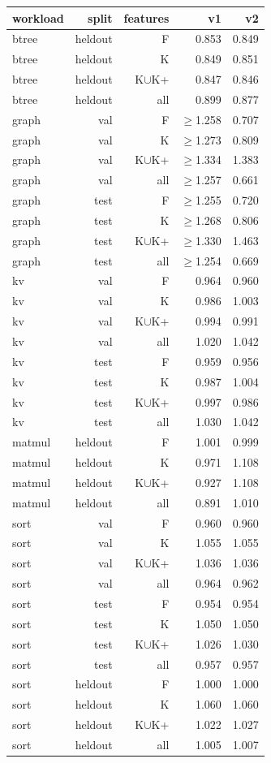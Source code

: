 \begin{tabular}{lrrrr}
\toprule
workload & split & features & v1 & v2 \\
\midrule
btree & heldout & F & 0.853 & 0.849 \\
btree & heldout & K & 0.849 & 0.851 \\
btree & heldout & K$\cup$K{+} & 0.847 & 0.846 \\
btree & heldout & all & 0.899 & 0.877 \\
graph & val & F & $\geq$1.258 & 0.707 \\
graph & val & K & $\geq$1.273 & 0.809 \\
graph & val & K$\cup$K{+} & $\geq$1.334 & 1.383 \\
graph & val & all & $\geq$1.257 & 0.661 \\
graph & test & F & $\geq$1.255 & 0.720 \\
graph & test & K & $\geq$1.268 & 0.806 \\
graph & test & K$\cup$K{+} & $\geq$1.330 & 1.463 \\
graph & test & all & $\geq$1.254 & 0.669 \\
kv & val & F & 0.964 & 0.960 \\
kv & val & K & 0.986 & 1.003 \\
kv & val & K$\cup$K{+} & 0.994 & 0.991 \\
kv & val & all & 1.020 & 1.042 \\
kv & test & F & 0.959 & 0.956 \\
kv & test & K & 0.987 & 1.004 \\
kv & test & K$\cup$K{+} & 0.997 & 0.986 \\
kv & test & all & 1.030 & 1.042 \\
matmul & heldout & F & 1.001 & 0.999 \\
matmul & heldout & K & 0.971 & 1.108 \\
matmul & heldout & K$\cup$K{+} & 0.927 & 1.108 \\
matmul & heldout & all & 0.891 & 1.010 \\
sort & val & F & 0.960 & 0.960 \\
sort & val & K & 1.055 & 1.055 \\
sort & val & K$\cup$K{+} & 1.036 & 1.036 \\
sort & val & all & 0.964 & 0.962 \\
sort & test & F & 0.954 & 0.954 \\
sort & test & K & 1.050 & 1.050 \\
sort & test & K$\cup$K{+} & 1.026 & 1.030 \\
sort & test & all & 0.957 & 0.957 \\
sort & heldout & F & 1.000 & 1.000 \\
sort & heldout & K & 1.060 & 1.060 \\
sort & heldout & K$\cup$K{+} & 1.022 & 1.027 \\
sort & heldout & all & 1.005 & 1.007 \\
\bottomrule
\end{tabular}
